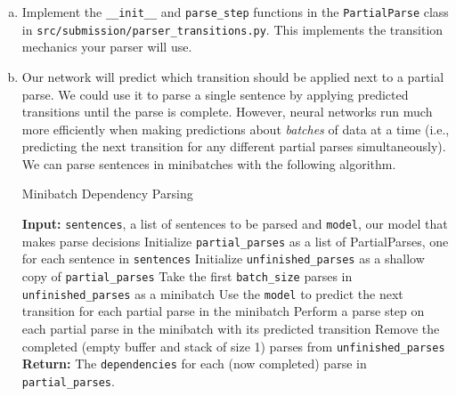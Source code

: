 \begin{enumerate}[(a)]
    \item {} Implement the \texttt{\_\_init\_\_} and \texttt{parse\_step} functions in the \texttt{PartialParse} class in \texttt{src/submission/parser\_transitions.py}. This implements the transition mechanics your parser will use. 
    
    \item {} Our network will predict which transition should be applied next to a partial parse. We could use it to parse a single sentence by applying predicted transitions until the parse is complete. However, neural networks run much more efficiently when making predictions about \textit{batches} of data at a time (i.e., predicting the next transition for any different partial parses simultaneously). We can parse sentences in minibatches with the following algorithm. \newline

    \begin{algorithm*}[h]
    \caption{Minibatch Dependency Parsing}
    \begin{algorithmic}
    	\State \textbf{Input:} \texttt{sentences}, a list of sentences to be parsed and \texttt{model}, our model that makes parse decisions
    	\State
    	\State Initialize \texttt{partial\_parses} as a list of PartialParses, one for each sentence in \texttt{sentences}
    	\State Initialize \texttt{unfinished\_parses} as a shallow copy of \texttt{partial\_parses}
    		\State Take the first \texttt{batch\_size} parses in \texttt{unfinished\_parses} as a minibatch
    		\State Use the \texttt{model} to predict the next transition for each partial parse in the minibatch
    		\State Perform a parse step on each partial parse in the minibatch with its predicted transition
    		\State Remove the completed (empty buffer and stack of size 1) parses from \texttt{unfinished\_parses}
    	\EndWhile
    	\State
    	\State \textbf{Return:} The \texttt{dependencies} for each (now completed) parse in \texttt{partial\_parses}.
    \end{algorithmic}
    \end{algorithm*}
    

\end{enumerate}
